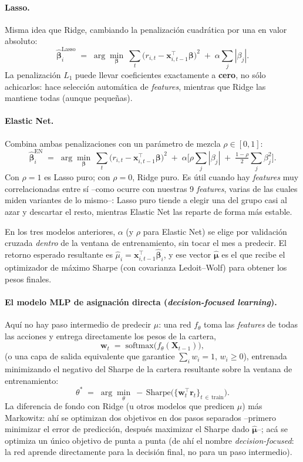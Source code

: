 \documentclass[11pt]{article}
\begin{document}
 
\paragraph{Lasso.} Misma idea que Ridge, cambiando la penalización cuadrática por una en valor
absoluto:
\[
\hat{\boldsymbol{\beta}}_i^{\text{Lasso}}
\;=\; \arg\min_{\boldsymbol{\beta}}\ \sum_{t}\big(r_{i,t}-\mathbf{x}_{i,t-1}^{\top}\boldsymbol{\beta}\big)^2
\;+\; \alpha\sum_j |\beta_j| .
\]
La penalización $L_1$ puede llevar coeficientes exactamente a \textbf{cero}, no sólo achicarlos: hace
selección automática de \emph{features}, mientras que Ridge las mantiene todas (aunque pequeñas).
 
\paragraph{Elastic Net.} Combina ambas penalizaciones con un parámetro de mezcla $\rho\in[0,1]$:
\[
\hat{\boldsymbol{\beta}}_i^{\text{EN}}
\;=\; \arg\min_{\boldsymbol{\beta}}\ \sum_{t}\big(r_{i,t}-\mathbf{x}_{i,t-1}^{\top}\boldsymbol{\beta}\big)^2
\;+\; \alpha\Big[\rho\sum_j |\beta_j| \;+\; \tfrac{1-\rho}{2}\sum_j \beta_j^2\Big].
\]
Con $\rho=1$ es Lasso puro; con $\rho=0$, Ridge puro. Es útil cuando hay \emph{features} muy
correlacionadas entre sí --como ocurre con nuestras 9 \emph{features}, varias de las cuales miden
variantes de lo mismo--: Lasso puro tiende a elegir una del grupo casi al azar y descartar el resto,
mientras Elastic Net las reparte de forma más estable.
 
En los tres modelos anteriores, $\alpha$ (y $\rho$ para Elastic Net) se elige por validación cruzada
\emph{dentro} de la ventana de entrenamiento, sin tocar el mes a predecir. El retorno esperado
resultante es $\hat{\mu}_i = \mathbf{x}_{i,t-1}^{\top}\hat{\boldsymbol{\beta}}_i$, y ese vector
$\hat{\boldsymbol{\mu}}$ es el que recibe el optimizador de máximo Sharpe (con covarianza
Ledoit--Wolf) para obtener los pesos finales.
 
\paragraph{El modelo MLP de asignación directa (\emph{decision-focused learning}).}
Aquí no hay paso intermedio de predecir $\mu$: una red $f_\theta$ toma las \emph{features} de todas
las acciones y entrega directamente los pesos de la cartera,
\[
\mathbf{w}_t \;=\; \text{softmax}\big(f_\theta(\mathbf{X}_{t-1})\big),
\]
(o una capa de salida equivalente que garantice $\sum_i w_i=1$, $w_i\ge 0$), entrenada minimizando el
negativo del Sharpe de la cartera resultante sobre la ventana de entrenamiento:
\[
\theta^{*} \;=\; \arg\min_{\theta}\ -\,\text{Sharpe}\big(\{\mathbf{w}_t^{\top}\mathbf{r}_t\}_{t\,\in\,\text{train}}\big).
\]
La diferencia de fondo con Ridge (u otros modelos que predicen $\mu$) más Markowitz: ahí se optimizan
dos objetivos en dos pasos separados --primero minimizar el error de predicción, después maximizar el
Sharpe dado $\hat{\boldsymbol{\mu}}$--; acá se optimiza un único objetivo de punta a punta (de ahí el
nombre \emph{decision-focused}: la red aprende directamente para la decisión final, no para un paso
intermedio).
\end{document}
